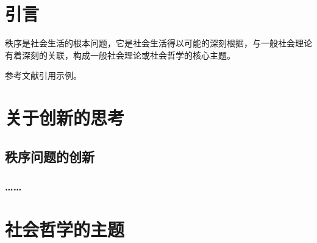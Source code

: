 \section{引言}
	秩序是社会生活的根本问题，它是社会生活得以可能的深刻根据，与一般社会理论有着深刻的关联，构成一般社会理论或社会哲学的核心主题。\par
	参考文献引用示例。
\section{关于创新的思考}
	\subsection{秩序问题的创新}
	\subsubsection{……}
\section{社会哲学的主题}
